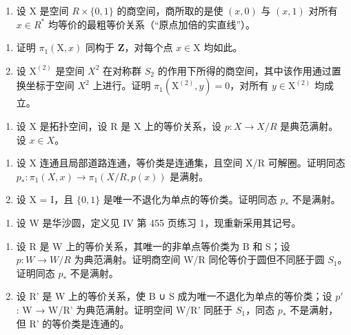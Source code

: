 \begin{enumerate}
\def\labelenumi{\arabic{enumi})}
\setcounter{enumi}{7}
\tightlist
\item
  设 X 是空间 \(R \times \{0,1\}\) 的商空间，商所取的是使 \((x,0)\) 与 \((x,1)\) 对所有 \(x \in R^{*}\) 均等价的最粗等价关系（“原点加倍的实直线”）。
\end{enumerate}

\begin{enumerate}
\def\labelenumi{\alph{enumi})}
\item
  证明 \(\pi_1(\mathrm{X},x)\) 同构于 \(\mathbf{Z}\)，对每个点 \(x\in \mathrm{X}\) 均如此。
\item
  设 \(\mathrm{X}^{(2)}\) 是空间 \(X^{2}\) 在对称群 \(S_{2}\) 的作用下所得的商空间，其中该作用通过置换坐标于空间 \(X^{2}\) 上进行。证明 \(\pi_{1}(\mathrm{X}^{(2)},y)=0\)，对所有 \(y\in\mathrm{X}^{(2)}\) 均成立。
\end{enumerate}

\begin{enumerate}
\def\labelenumi{\arabic{enumi})}
\setcounter{enumi}{8}
\tightlist
\item
  设 X 是拓扑空间，设 R 是 X 上的等价关系，设 \(p: X \to X/R\) 是典范满射。设 \(x \in X\)。
\end{enumerate}

\begin{enumerate}
\def\labelenumi{\alph{enumi})}
\item
  设 X 连通且局部道路连通，等价类是连通集，且空间 X/R 可解圈。证明同态 \(p_{*}:\pi_{1}(X,x)\to\pi_{1}(X/R,p(x))\) 是满射。
\item
  设 X = I，且 \(\{0,1\}\) 是唯一不退化为单点的等价类。证明同态 \(p_{*}\) 不是满射。
\end{enumerate}

\begin{enumerate}
\def\labelenumi{\arabic{enumi})}
\setcounter{enumi}{9}
\tightlist
\item
  设 W 是华沙圆，定义见 IV 第 455 页练习 1，现重新采用其记号。
\end{enumerate}

\begin{enumerate}
\def\labelenumi{\alph{enumi})}
\item
  设 R 是 W 上的等价关系，其唯一的非单点等价类为 B 和 S；设 \(p: W \rightarrow W/R\) 为典范满射。证明商空间 W/R 同伦等价于圆但不同胚于圆 \(S_{1}\)。证明同态 \(p_{*}\) 不是满射。
\item
 设 R' 是 W 上的等价关系，使 B ∪ S 成为唯一不退化为单点的等价类；设 \(p'\) : W → W/R' 为典范满射。证明空间 W/R' 同胚于 \(S_{1}\)，同态 \(p_{*}\) 不是满射，但 R' 的等价类是连通的。
\end{enumerate}

